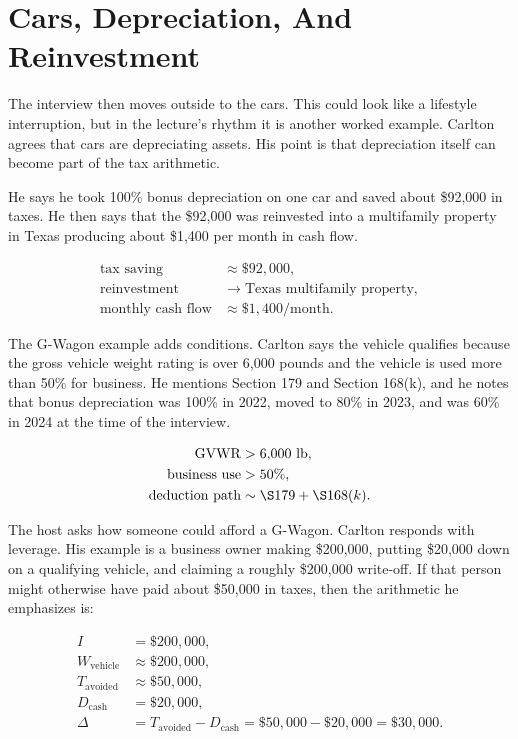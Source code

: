 \section{Cars, Depreciation, And Reinvestment}

The interview then moves outside to the cars. This could look like a lifestyle interruption, but in the lecture's rhythm it is another worked example. Carlton agrees that cars are depreciating assets. His point is that depreciation itself can become part of the tax arithmetic.

He says he took 100\% bonus depreciation on one car and saved about \$92,000 in taxes. He then says that the \$92,000 was reinvested into a multifamily property in Texas producing about \$1,400 per month in cash flow.

\begin{align}
\text{tax saving} &\approx \$92{,}000,\\
\text{reinvestment} &\longrightarrow \text{Texas multifamily property},\\
\text{monthly cash flow} &\approx \$1{,}400/\text{month}.
\end{align}

The G-Wagon example adds conditions. Carlton says the vehicle qualifies because the gross vehicle weight rating is over 6,000 pounds and the vehicle is used more than 50\% for business. He mentions Section 179 and Section 168(k), and he notes that bonus depreciation was 100\% in 2022, moved to 80\% in 2023, and was 60\% in 2024 at the time of the interview.

\begin{align}
\mathrm{GVWR} &> 6{,}000\ \mathrm{lb},\\
\text{business use} &> 50\%,\\
\text{deduction path} &\sim \S 179+\S 168(k).
\end{align}

The host asks how someone could afford a G-Wagon. Carlton responds with leverage. His example is a business owner making \$200,000, putting \$20,000 down on a qualifying vehicle, and claiming a roughly \$200,000 write-off. If that person might otherwise have paid about \$50,000 in taxes, then the arithmetic he emphasizes is:

\begin{align}
I &= \$200{,}000,\\
W_{\mathrm{vehicle}} &\approx \$200{,}000,\\
T_{\mathrm{avoided}} &\approx \$50{,}000,\\
D_{\mathrm{cash}} &= \$20{,}000,\\
\Delta &= T_{\mathrm{avoided}}-D_{\mathrm{cash}}
       = \$50{,}000-\$20{,}000
       = \$30{,}000.
\end{align}

